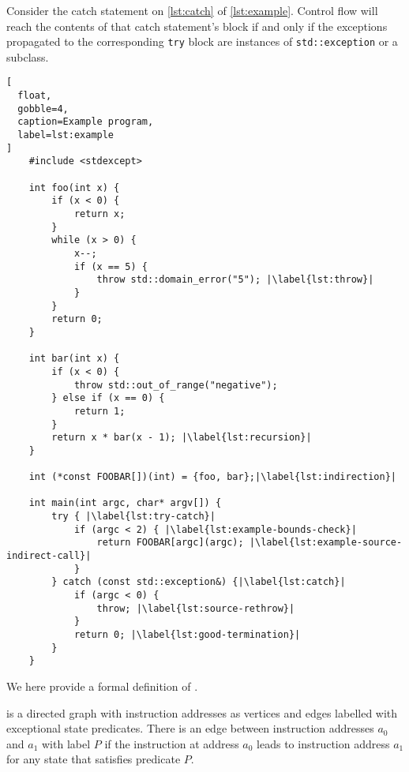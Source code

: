 \begin{example}
  Consider the catch statement on \cref{lst:catch} of \cref{lst:example}.
  Control flow will reach the contents of that catch statement's block if and only if the exceptions propagated to the corresponding \lstinline|try| block are instances of \lstinline|std::exception| or a subclass.
\end{example}
\begin{lstlisting}[
  float,
  gobble=4,
  caption=Example program,
  label=lst:example
]
    #include <stdexcept>

    int foo(int x) {
        if (x < 0) {
            return x;
        }
        while (x > 0) {
            x--;
            if (x == 5) {
                throw std::domain_error("5"); |\label{lst:throw}|
            }
        }
        return 0;
    }

    int bar(int x) {
        if (x < 0) {
            throw std::out_of_range("negative");
        } else if (x == 0) {
            return 1;
        }
        return x * bar(x - 1); |\label{lst:recursion}|
    }

    int (*const FOOBAR[])(int) = {foo, bar};|\label{lst:indirection}|

    int main(int argc, char* argv[]) {
        try { |\label{lst:try-catch}|
            if (argc < 2) { |\label{lst:example-bounds-check}|
                return FOOBAR[argc](argc); |\label{lst:example-source-indirect-call}|
            }
        } catch (const std::exception&) {|\label{lst:catch}|
            if (argc < 0) {
                throw; |\label{lst:source-rethrow}|
            }
            return 0; |\label{lst:good-termination}|
        }
    }
\end{lstlisting}

We here provide a formal definition of .
\begin{definition}\label{def:eicfg}
   is a directed graph with instruction addresses as vertices and edges labelled with exceptional state predicates.
  There is an edge between instruction addresses $a_0$ and $a_1$ with label $P$ if the instruction at address $a_0$ leads to instruction address $a_1$ for any state that satisfies predicate $P$.
\end{definition}

